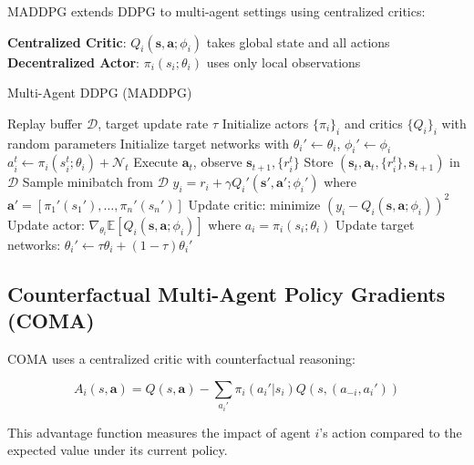 MADDPG extends DDPG to multi-agent settings using centralized critics:

\textbf{Centralized Critic}: $Q_i(\mathbf{s}, \mathbf{a}; \phi_i)$ takes global state and all actions
\textbf{Decentralized Actor}: $\pi_i(s_i; \theta_i)$ uses only local observations

\begin{algorithm}
\caption{Multi-Agent DDPG (MADDPG)}
\begin{algorithmic}
\REQUIRE Replay buffer $\mathcal{D}$, target update rate $\tau$
\STATE Initialize actors $\{\pi_i\}_i$ and critics $\{Q_i\}_i$ with random parameters
\STATE Initialize target networks with $\theta_i' \leftarrow \theta_i$, $\phi_i' \leftarrow \phi_i$
            \STATE $a_i^t \leftarrow \pi_i(s_i^t; \theta_i) + \mathcal{N}_t$ 
        \ENDFOR
        \STATE Execute $\mathbf{a}_t$, observe $\mathbf{s}_{t+1}, \{r_i^t\}$
        \STATE Store $(\mathbf{s}_t, \mathbf{a}_t, \{r_i^t\}, \mathbf{s}_{t+1})$ in $\mathcal{D}$
            \STATE Sample minibatch from $\mathcal{D}$
            \STATE $y_i = r_i + \gamma Q_i'(\mathbf{s}', \mathbf{a}'; \phi_i')$ where $\mathbf{a}' = [\pi_1'(s_1'), \ldots, \pi_n'(s_n')]$
            \STATE Update critic: minimize $(y_i - Q_i(\mathbf{s}, \mathbf{a}; \phi_i))^2$
            \STATE Update actor: $\nabla_{\theta_i} \mathbb{E} [Q_i(\mathbf{s}, \mathbf{a}; \phi_i)]$ where $a_i = \pi_i(s_i; \theta_i)$
            \STATE Update target networks: $\theta_i' \leftarrow \tau \theta_i + (1-\tau) \theta_i'$
        \ENDFOR
    \ENDFOR
\ENDFOR
\end{algorithmic}
\end{algorithm}

\subsection{Counterfactual Multi-Agent Policy Gradients (COMA)}

COMA uses a centralized critic with counterfactual reasoning:

\begin{equation}
A_i(s, \mathbf{a}) = Q(s, \mathbf{a}) - \sum_{a_i'} \pi_i(a_i'|s_i) Q(s, (a_{-i}, a_i'))
\end{equation}

This advantage function measures the impact of agent $i$'s action compared to the expected value under its current policy.

